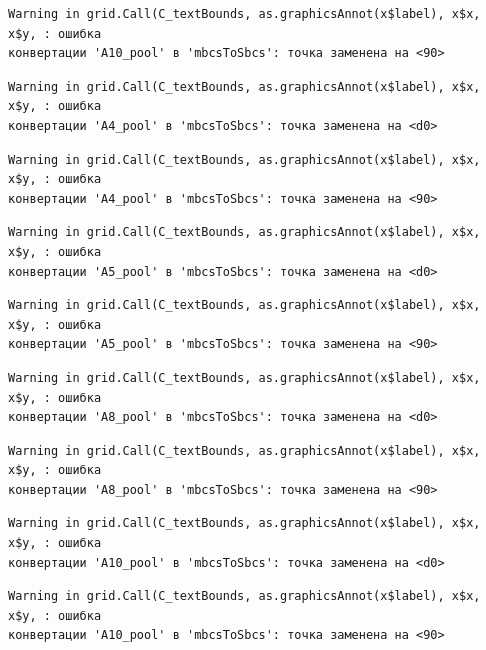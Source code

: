 \documentclass[
  letterpaper,
  DIV=11,
  numbers=noendperiod]{scrreprt}
\begin{document}
\begin{verbatim}
Warning in grid.Call(C_textBounds, as.graphicsAnnot(x$label), x$x, x$y, : ошибка
конвертации 'А10_pool' в 'mbcsToSbcs': точка заменена на <90>
\end{verbatim}

\begin{verbatim}
Warning in grid.Call(C_textBounds, as.graphicsAnnot(x$label), x$x, x$y, : ошибка
конвертации 'А4_pool' в 'mbcsToSbcs': точка заменена на <d0>
\end{verbatim}

\begin{verbatim}
Warning in grid.Call(C_textBounds, as.graphicsAnnot(x$label), x$x, x$y, : ошибка
конвертации 'А4_pool' в 'mbcsToSbcs': точка заменена на <90>
\end{verbatim}

\begin{verbatim}
Warning in grid.Call(C_textBounds, as.graphicsAnnot(x$label), x$x, x$y, : ошибка
конвертации 'А5_pool' в 'mbcsToSbcs': точка заменена на <d0>
\end{verbatim}

\begin{verbatim}
Warning in grid.Call(C_textBounds, as.graphicsAnnot(x$label), x$x, x$y, : ошибка
конвертации 'А5_pool' в 'mbcsToSbcs': точка заменена на <90>
\end{verbatim}

\begin{verbatim}
Warning in grid.Call(C_textBounds, as.graphicsAnnot(x$label), x$x, x$y, : ошибка
конвертации 'А8_pool' в 'mbcsToSbcs': точка заменена на <d0>
\end{verbatim}

\begin{verbatim}
Warning in grid.Call(C_textBounds, as.graphicsAnnot(x$label), x$x, x$y, : ошибка
конвертации 'А8_pool' в 'mbcsToSbcs': точка заменена на <90>
\end{verbatim}

\begin{verbatim}
Warning in grid.Call(C_textBounds, as.graphicsAnnot(x$label), x$x, x$y, : ошибка
конвертации 'А10_pool' в 'mbcsToSbcs': точка заменена на <d0>
\end{verbatim}

\begin{verbatim}
Warning in grid.Call(C_textBounds, as.graphicsAnnot(x$label), x$x, x$y, : ошибка
конвертации 'А10_pool' в 'mbcsToSbcs': точка заменена на <90>
\end{verbatim}
\end{document}
